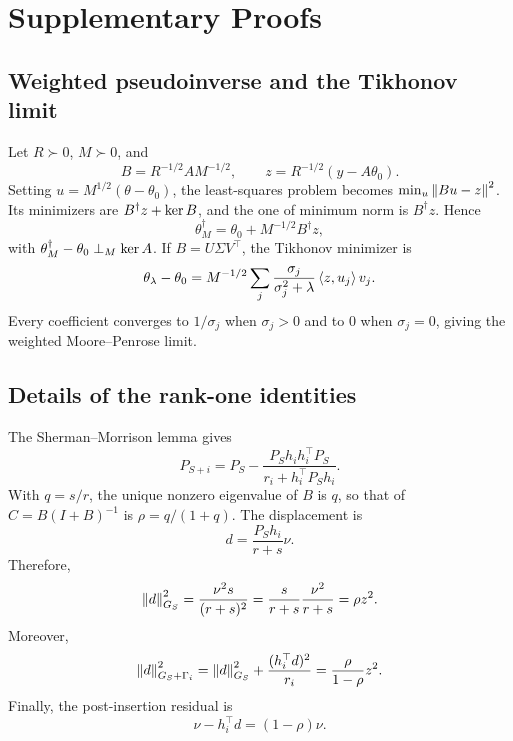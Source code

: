 \section{Supplementary Proofs}
\label{app:proofs}
\subsection{Weighted pseudoinverse and the Tikhonov limit}
\label{app:pseudoinverse}
Let $R\succ0$, $M\succ0$, and
\[
B=R^{-1/2}AM^{-1/2},
\qquad
z=R^{-1/2}(y-A\theta_0).
\]
Setting $u=M^{1/2}(\theta-\theta_0)$, the least-squares problem becomes $\min_u\left\lVert Bu-z\right\rVert^2$. Its minimizers are $B^\dagger z+\operatorname{ker} B$, and the one of minimum norm is $B^\dagger z$. Hence
\[
\theta_M^\dagger=\theta_0+M^{-1/2}B^\dagger z,
\]
with $\theta_M^\dagger-\theta_0\perp_M\operatorname{ker} A$. If $B=U\Sigma V^\top$, the Tikhonov minimizer is
\[
\theta_\lambda-\theta_0
=M^{-1/2}\sum_j\frac{\sigma_j}{\sigma_j^2+\lambda}\left\langle z,u_j\right\rangle v_j.
\]
Every coefficient converges to $1/\sigma_j$ when $\sigma_j>0$ and to $0$ when $\sigma_j=0$, giving the weighted Moore--Penrose limit.

\subsection{Details of the rank-one identities}
\label{app:rankone}
The Sherman--Morrison lemma gives
\[
P_{S+i}=P_S-
\frac{P_Sh_ih_i^\top P_S}{r_i+h_i^\top P_Sh_i}.
\]
With $q=s/r$, the unique nonzero eigenvalue of $B$ is $q$, so that of $C=B(I+B)^{-1}$ is $\rho=q/(1+q)$. The displacement is
\[
d=\frac{P_Sh_i}{r+s}\nu.
\]
Therefore,
\[
\left\lVert d\right\rVert_{G_S}^2
=\frac{\nu^2s}{(r+s)^2}
=\frac{s}{r+s}\frac{\nu^2}{r+s}
=\rho z^2.
\]
Moreover,
\[
\left\lVert d\right\rVert_{G_S+\Gamma_i}^2
=\left\lVert d\right\rVert_{G_S}^2+\frac{(h_i^\top d)^2}{r_i}
=\frac{\rho}{1-\rho}z^2.
\]
Finally, the post-insertion residual is
\[
\nu-h_i^\top d=(1-\rho)\nu.
\]

